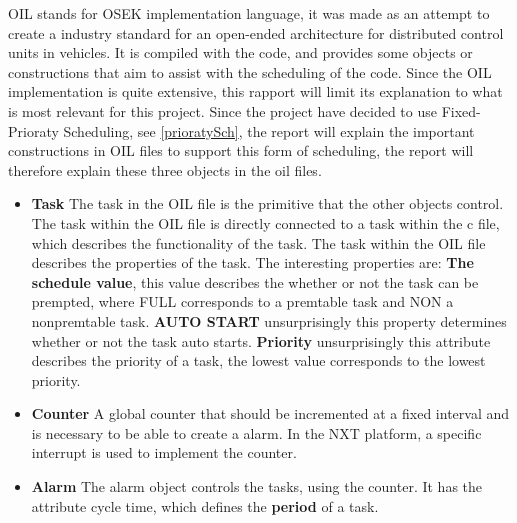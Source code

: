 OIL stands for OSEK implementation language, it was made as an attempt to create a industry standard for an open-ended architecture for distributed control units in vehicles\cite{OILManual}. It is compiled with the code, and provides some objects or constructions that aim to assist with the scheduling of the code. Since the OIL implementation is quite extensive, this rapport will limit its explanation to what is most relevant for this project. Since the project have decided to use Fixed-Prioraty Scheduling, see \ref{prioratySch}, the report will explain the important constructions in OIL files to support this form of scheduling, the report will therefore explain these three objects in the oil files.

\begin{itemize}
    \item{\textbf{Task}}
    The task in the OIL file is the primitive that the other objects control. The task within the OIL file is directly connected to a task within the c file, which describes the functionality of the task. The task within the OIL file describes the properties of the task. The interesting properties are: \textbf{The schedule value}, this value describes the whether or not the task can be prempted, where FULL corresponds to a premtable task and NON a nonpremtable task. \textbf{AUTO START} unsurprisingly this property determines whether or not the task auto starts. 
    \textbf{Priority} unsurprisingly this attribute describes the priority of a task, the lowest value corresponds to the lowest priority.
    \item{\textbf{Counter}}
    A global counter that should be incremented at a fixed interval and is necessary to be able to create a alarm. In the NXT platform, a specific interrupt is used to implement the counter. 
    \item{\textbf{Alarm}}
    The alarm object controls the tasks, using the counter.  It has the attribute cycle time, which defines the \textbf{period} of a task. 
    

\end{itemize}
